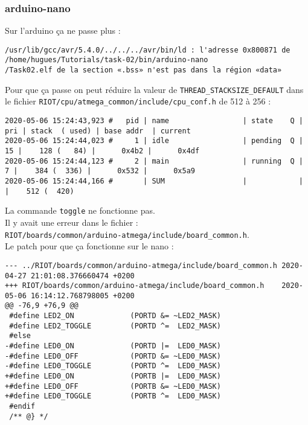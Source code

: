 \subsubsection{arduino-nano}
Sur l'arduino ça ne passe plus :
{\scriptsize
\begin{verbatim}
/usr/lib/gcc/avr/5.4.0/../../../avr/bin/ld : l'adresse 0x800871 de /home/hugues/Tutorials/task-02/bin/arduino-nano
/Task02.elf de la section «.bss» n'est pas dans la région «data»
\end{verbatim}
}
Pour que ça passe on peut réduire la valeur de
\texttt{THREAD\_STACKSIZE\_DEFAULT} dans le fichier
\texttt{RIOT/cpu/atmega\_common/include/cpu\_conf.h} de 512 à 256 :
{\scriptsize
\begin{verbatim}
2020-05-06 15:24:43,923 # 	pid | name                 | state    Q | pri | stack  ( used) | base addr  | current     
2020-05-06 15:24:44,023 # 	  1 | idle                 | pending  Q |  15 |    128 (   84) |      0x4b2 |      0x4df 
2020-05-06 15:24:44,123 # 	  2 | main                 | running  Q |   7 |    384 (  336) |      0x532 |      0x5a9 
2020-05-06 15:24:44,166 # 	    | SUM                  |            |     |    512 (  420)
\end{verbatim}
}
La commande \texttt{toggle} ne fonctionne pas.\\

Il y avait une erreur dans le fichier :\\
\texttt{RIOT/boards/common/arduino-atmega/include/board\_common.h}.\\

Le patch pour que ça fonctionne sur le nano :
\begin{lstlisting}
--- ../RIOT/boards/common/arduino-atmega/include/board_common.h	2020-04-27 21:01:08.376660474 +0200
+++ RIOT/boards/common/arduino-atmega/include/board_common.h	2020-05-06 16:14:12.768798005 +0200
@@ -76,9 +76,9 @@
 #define LED2_ON             (PORTD &= ~LED2_MASK)
 #define LED2_TOGGLE         (PORTD ^=  LED2_MASK)
 #else
-#define LED0_ON             (PORTD |=  LED0_MASK)
-#define LED0_OFF            (PORTD &= ~LED0_MASK)
-#define LED0_TOGGLE         (PORTD ^=  LED0_MASK)
+#define LED0_ON             (PORTB |=  LED0_MASK)
+#define LED0_OFF            (PORTB &= ~LED0_MASK)
+#define LED0_TOGGLE         (PORTB ^=  LED0_MASK)
 #endif
 /** @} */
\end{lstlisting}

